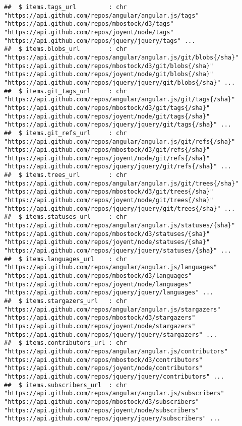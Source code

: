 \documentclass{article}\usepackage[]{graphicx}\usepackage[]{color}
\makeatletter
\newenvironment{kframe}{%
 \def\at@end@of@kframe{}%
 \ifinner\ifhmode%
  \def\at@end@of@kframe{\end{minipage}}%
  \begin{minipage}{\columnwidth}%
 \fi\fi%
 \def\FrameCommand##1{\hskip\@totalleftmargin \hskip-\fboxsep
 \colorbox{shadecolor}{##1}\hskip-\fboxsep
     \hskip-\linewidth \hskip-\@totalleftmargin \hskip\columnwidth}%
 \MakeFramed {\advance\hsize-\width
   \@totalleftmargin\z@ \linewidth\hsize
   \@setminipage}}%
 {\par\unskip\endMakeFramed%
 \at@end@of@kframe}
\newenvironment{knitrout}{}{} %
\makeatother
\begin{document}
\begin{knitrout}
\begin{kframe}
\begin{verbatim}
##  $ items.tags_url         : chr  "https://api.github.com/repos/angular/angular.js/tags" "https://api.github.com/repos/mbostock/d3/tags" "https://api.github.com/repos/joyent/node/tags" "https://api.github.com/repos/jquery/jquery/tags" ...
##  $ items.blobs_url        : chr  "https://api.github.com/repos/angular/angular.js/git/blobs{/sha}" "https://api.github.com/repos/mbostock/d3/git/blobs{/sha}" "https://api.github.com/repos/joyent/node/git/blobs{/sha}" "https://api.github.com/repos/jquery/jquery/git/blobs{/sha}" ...
##  $ items.git_tags_url     : chr  "https://api.github.com/repos/angular/angular.js/git/tags{/sha}" "https://api.github.com/repos/mbostock/d3/git/tags{/sha}" "https://api.github.com/repos/joyent/node/git/tags{/sha}" "https://api.github.com/repos/jquery/jquery/git/tags{/sha}" ...
##  $ items.git_refs_url     : chr  "https://api.github.com/repos/angular/angular.js/git/refs{/sha}" "https://api.github.com/repos/mbostock/d3/git/refs{/sha}" "https://api.github.com/repos/joyent/node/git/refs{/sha}" "https://api.github.com/repos/jquery/jquery/git/refs{/sha}" ...
##  $ items.trees_url        : chr  "https://api.github.com/repos/angular/angular.js/git/trees{/sha}" "https://api.github.com/repos/mbostock/d3/git/trees{/sha}" "https://api.github.com/repos/joyent/node/git/trees{/sha}" "https://api.github.com/repos/jquery/jquery/git/trees{/sha}" ...
##  $ items.statuses_url     : chr  "https://api.github.com/repos/angular/angular.js/statuses/{sha}" "https://api.github.com/repos/mbostock/d3/statuses/{sha}" "https://api.github.com/repos/joyent/node/statuses/{sha}" "https://api.github.com/repos/jquery/jquery/statuses/{sha}" ...
##  $ items.languages_url    : chr  "https://api.github.com/repos/angular/angular.js/languages" "https://api.github.com/repos/mbostock/d3/languages" "https://api.github.com/repos/joyent/node/languages" "https://api.github.com/repos/jquery/jquery/languages" ...
##  $ items.stargazers_url   : chr  "https://api.github.com/repos/angular/angular.js/stargazers" "https://api.github.com/repos/mbostock/d3/stargazers" "https://api.github.com/repos/joyent/node/stargazers" "https://api.github.com/repos/jquery/jquery/stargazers" ...
##  $ items.contributors_url : chr  "https://api.github.com/repos/angular/angular.js/contributors" "https://api.github.com/repos/mbostock/d3/contributors" "https://api.github.com/repos/joyent/node/contributors" "https://api.github.com/repos/jquery/jquery/contributors" ...
##  $ items.subscribers_url  : chr  "https://api.github.com/repos/angular/angular.js/subscribers" "https://api.github.com/repos/mbostock/d3/subscribers" "https://api.github.com/repos/joyent/node/subscribers" "https://api.github.com/repos/jquery/jquery/subscribers" ...

\end{verbatim}
\end{kframe}
\end{knitrout}
\end{document}
